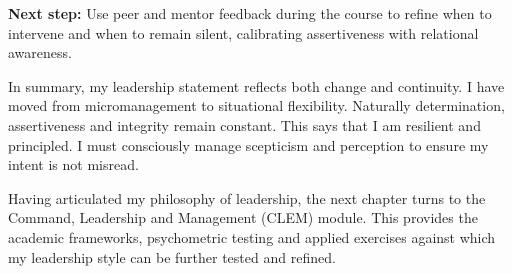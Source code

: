 \textbf{Next step:} Use peer and mentor feedback during the course to refine when to intervene and when to remain silent, calibrating assertiveness with relational awareness.

In summary, my leadership statement reflects both change and continuity. I have moved from micromanagement to situational flexibility. Naturally determination, assertiveness  and integrity remain constant. This says that I am resilient and principled. I must consciously manage scepticism and perception to ensure my intent is not misread.

Having articulated my philosophy of leadership, the next chapter turns to the Command, Leadership and Management (CLEM) module. This provides the academic frameworks, psychometric testing and applied exercises against which my leadership style can be further tested and refined.